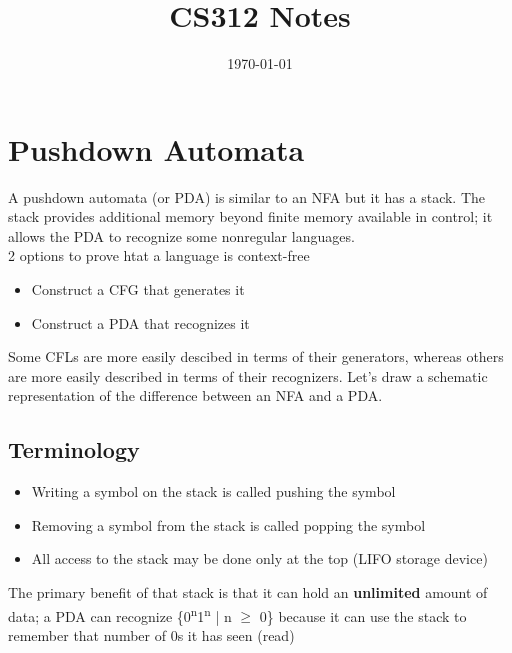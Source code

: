 \documentclass[11pt]{article}
\date{\today}
\title{CS312 Notes}
\begin{document}
\maketitle
\tableofcontents

\section{Pushdown Automata}
\label{sec:orgc551a51}
A pushdown automata (or PDA) is similar to an NFA but it has a stack. The stack provides additional memory beyond finite memory available in control; it allows the PDA to recognize some nonregular languages.\\

2 options to prove htat a language is context-free\\
\begin{itemize}
\item Construct a CFG that generates it\\
\item Construct a PDA that recognizes it\\
\end{itemize}

Some CFLs are more easily descibed in terms of their generators, whereas others are more easily described in terms of their recognizers. Let's draw a schematic representation of the difference between an NFA and a PDA.\\
\subsection{Terminology}
\label{sec:orgeb4bfe1}
\begin{itemize}
\item Writing a symbol on the stack is called pushing the symbol\\
\item Removing a symbol from the stack is called popping the symbol\\
\item All access to the stack may be done only at the top (LIFO storage device)\\
\end{itemize}

The primary benefit of that stack is that it can hold an \textbf{unlimited} amount of data; a PDA can recognize \{0\textsuperscript{n}1\textsuperscript{n} | n \(\ge\) 0\} because it can use the stack to remember that number of 0s it has seen (read)\\
\end{document}
